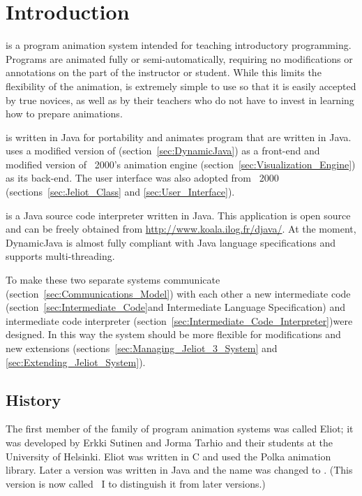 \section{Introduction}
\label{sec:Introduction}

\jel{} is a program animation system intended for teaching introductory
programming. Programs are animated fully or semi-automatically, requiring
no modifications or annotations on the part of the instructor or student.
While this limits the flexibility of the animation, \jel{} is extremely
simple to use so that it is easily accepted by true novices, as well as
by their teachers who do not have to invest in learning how to prepare
animations.

\jel{} is written in Java for portability and animates program that are
written in Java. \jel{} uses a modified version of \djava{} \citep{DJava}
(section~\ref{sec:DynamicJava}) as a front-end and
modified version of \jel{}~2000's animation engine
(section~\ref{sec:Visualization_Engine}) as its back-end. The user interface
was also adopted from \jel{}~2000 (sections~\ref{sec:Jeliot_Class} and
\ref{sec:User_Interface}).

\djava{} is a Java source code interpreter written in Java. This
application is open source and can be freely obtained from
\url{http://www.koala.ilog.fr/djava/}. At the moment, DynamicJava is
almost fully compliant with Java language specifications and supports
multi-threading.

To make these two separate systems communicate (section~\ref{sec:Communications_Model})
with each other a new intermediate code (section~\ref{sec:Intermediate_Code}and
Intermediate Language Specification) and intermediate code interpreter (section~\ref{sec:Intermediate_Code_Interpreter})were designed. In this way
the system should be more flexible for modifications and new extensions (sections~\ref{sec:Managing_Jeliot_3_System} and \ref{sec:Extending_Jeliot_System}).

\subsection{History}

The first member of the \jel{} family of program animation systems was
called Eliot; it was developed by Erkki Sutinen and Jorma Tarhio and
their students at the University of Helsinki. Eliot was written in C
and used the Polka animation library. Later a version was written in
Java and the name was changed to \jel{}. (This version is now called
\jel{}~I to distinguish it from later versions.)

